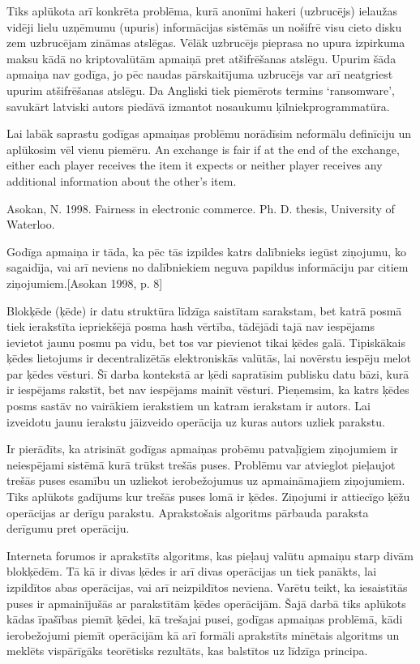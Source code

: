 Tiks aplūkota arī konkrēta problēma, kurā anonīmi hakeri (uzbrucējs) ielaužas vidēji lielu uzņēmumu (upuris) informācijas sistēmās un nošifrē visu cieto disku zem uzbrucējam zināmas atslēgas. 
Vēlāk uzbrucējs pieprasa no upura izpirkuma maksu kādā no kriptovalūtām apmaiņā pret atšifrēšanas atslēgu. 
Upurim šāda apmaiņa nav godīga, jo pēc naudas pārskaitījuma uzbrucējs var arī neatgriest upurim atšifrēšanas atslēgu.
Da 
Angliski tiek piemērots termins `ransomware', savukārt latviski autors piedāvā izmantot nosaukumu ķīlniekprogrammatūra.



Lai labāk saprastu godīgas apmaiņas problēmu norādīsim neformālu definīciju un aplūkosim vēl vienu piemēru.  
An exchange is fair if at the end of the exchange, either each player
receives the item it expects or neither player receives any additional
information about the other's item.\cite[p.~8]{asokan98}

Asokan, N. 1998. Fairness in electronic commerce. Ph. D. thesis, University of Waterloo.

Godīga apmaiņa ir tāda, ka pēc tās izpildes katrs dalībnieks iegūst ziņojumu, ko sagaidīja, vai arī neviens no dalībniekiem neguva papildus informāciju par citiem ziņojumiem.[Asokan 1998, p. 8]

Blokķēde (ķēde) ir datu struktūra līdzīga saistītam sarakstam, bet katrā posmā tiek ierakstīta iepriekšējā posma hash vērtība, tādējādi tajā nav iespējams ievietot jaunu posmu pa vidu, bet tos var pievienot tikai ķēdes galā. 
Tipiskākais ķēdes lietojums ir decentralizētās elektroniskās valūtās, lai novērstu iespēju melot par ķēdes vēsturi. 
Šī darba kontekstā ar ķēdi sapratīsim publisku datu bāzi, kurā ir iespējams rakstīt, bet nav iespējams mainīt vēsturi.
Pieņemsim, ka katrs ķēdes posms sastāv no vairākiem ierakstiem un katram ierakstam ir autors.
Lai izveidotu jaunu ierakstu jāizveido operācija uz kuras autors uzliek parakstu.

Ir pierādīts, ka atrisināt godīgas apmaiņas probēmu patvaļīgiem ziņojumiem ir neiespējami sistēmā kurā trūkst trešās puses. 
Problēmu var atvieglot pieļaujot trešās puses esamību un uzliekot ierobežojumus uz apmaināmajiem ziņojumiem.
Tiks aplūkots gadījums kur trešās puses lomā ir ķēdes.
Ziņojumi ir attiecīgo ķēžu operācijas ar derīgu parakstu.
Aprakstošais algoritms pārbauda paraksta derīgumu pret operāciju. 

Interneta forumos ir aprakstīts algoritms, kas pieļauj valūtu apmaiņu starp divām blokķēdēm.
Tā kā ir divas ķēdes ir arī divas operācijas un tiek panākts, lai izpildītos abas operācijas, vai arī neizpildītos neviena.
Varētu teikt, ka iesaistītās puses ir apmainījušās ar parakstītām ķēdes operācijām.
Šajā darbā tiks aplūkots kādas īpašības piemīt ķēdei, kā trešajai pusei, godīgas apmaiņas problēmā, kādi ierobežojumi piemīt operācijām kā arī formāli aprakstīts minētais algoritms un meklēts vispārīgāks teorētisks rezultāts, kas balstītos uz līdzīga principa.



